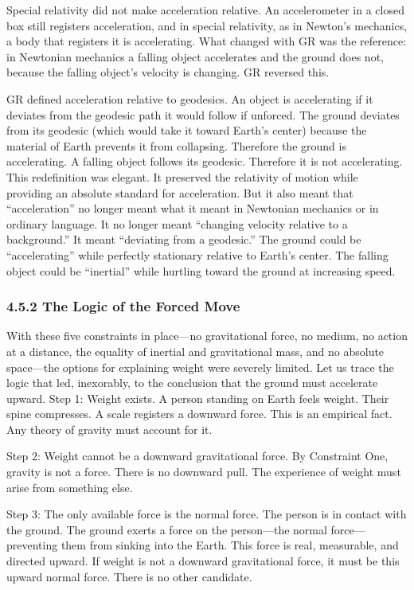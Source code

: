 \documentclass[11pt]{article}
\begin{document}
Special relativity did not make acceleration relative. An accelerometer in a closed box still registers acceleration, and in special relativity, as in Newton's mechanics, a body that registers it is accelerating. What changed with GR was the reference: in Newtonian mechanics a falling object accelerates and the ground does not, because the falling object's velocity is changing. GR reversed this.

GR defined acceleration relative to geodesics. An object is accelerating if it deviates from the geodesic path it would follow if unforced. The ground deviates from its geodesic (which would take it toward Earth's center) because the material of Earth prevents it from collapsing. Therefore the ground is accelerating. A falling object follows its geodesic. Therefore it is not accelerating. This redefinition was elegant. It preserved the relativity of motion while providing an absolute standard for acceleration. But it also meant that ``acceleration'' no longer meant what it meant in Newtonian mechanics or in ordinary language. It no longer meant ``changing velocity relative to a background.'' It meant ``deviating from a geodesic.'' The ground could be ``accelerating'' while perfectly stationary relative to Earth's center. The falling object could be ``inertial'' while hurtling toward the ground at increasing speed.

\subsubsection{4.5.2 The Logic of the Forced Move}

With these five constraints in place---no gravitational force, no medium, no action at a distance, the equality of inertial and gravitational mass, and no absolute space---the options for explaining weight were severely limited. Let us trace the logic that led, inexorably, to the conclusion that the ground must accelerate upward. Step 1: Weight exists. A person standing on Earth feels weight. Their spine compresses. A scale registers a downward force. This is an empirical fact. Any theory of gravity must account for it.

Step 2: Weight cannot be a downward gravitational force. By Constraint One, gravity is not a force. There is no downward pull. The experience of weight must arise from something else.

Step 3: The only available force is the normal force. The person is in contact with the ground. The ground exerts a force on the person---the normal force---preventing them from sinking into the Earth. This force is real, measurable, and directed upward. If weight is not a downward gravitational force, it must be this upward normal force. There is no other candidate.
\end{document}
